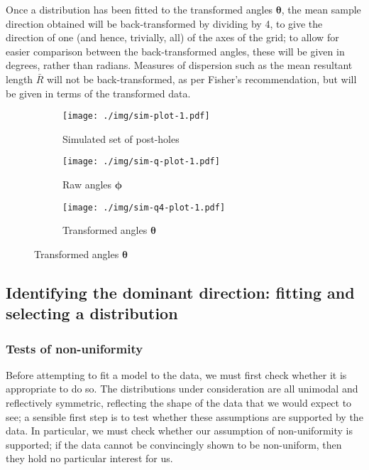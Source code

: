 \documentclass[../../ArchStats.tex]{subfiles}
\begin{document}
Once a distribution has been fitted to the transformed angles $\mathbf{\theta}$, the mean sample direction obtained will be back-transformed by dividing by 4, to give the direction of one (and hence, trivially, all) of the axes of the grid; to allow for easier comparison between the back-transformed angles, these will be given in degrees, rather than radians. Measures of dispersion such as the mean resultant length $\bar{R}$ will not be back-transformed, as per Fisher's recommendation, but will be given in terms of the transformed data.

\begin{figure}[h!]
\centering
\caption{Simulated set of buildings with post-holes 1m apart, with Gaussian $N(0,0.1)$ perturbation, and associated angles }
\label{fig:sim1}
\begin{subfigure}[t]{0.38\textwidth}
\caption{Simulated set of post-holes}
\label{fig:sim-plot-1}
\texttt{[image: ./img/sim-plot-1.pdf]}
\end{subfigure}
\begin{subfigure}[t]{0.3\textwidth}
\caption{Raw angles $\mathbf{\phi}$}
\label{fig:sim-q-plot-1}
\texttt{[image: ./img/sim-q-plot-1.pdf]}
\end{subfigure}
\begin{subfigure}[t]{0.3\textwidth}
\caption{Transformed angles $\mathbf{\theta}$}
\label{fig:sim-q4-plot-1}
\texttt{[image: ./img/sim-q4-plot-1.pdf]}
\end{subfigure}
\end{figure}

\subsection{Identifying the dominant direction: fitting and selecting a distribution}

\subsubsection{Tests of non-uniformity}
\label{sec:unif-tests}
Before attempting to fit a model to the data, we must first check whether it is appropriate to do so. The distributions under consideration are all unimodal and reflectively symmetric, reflecting the shape of the data that we would expect to see; a sensible first step is to test whether these assumptions are supported by the data. In particular, we must check whether our assumption of non-uniformity is supported; if the data cannot be convincingly shown to be non-uniform, then they hold no particular interest for us. 
\end{document}
